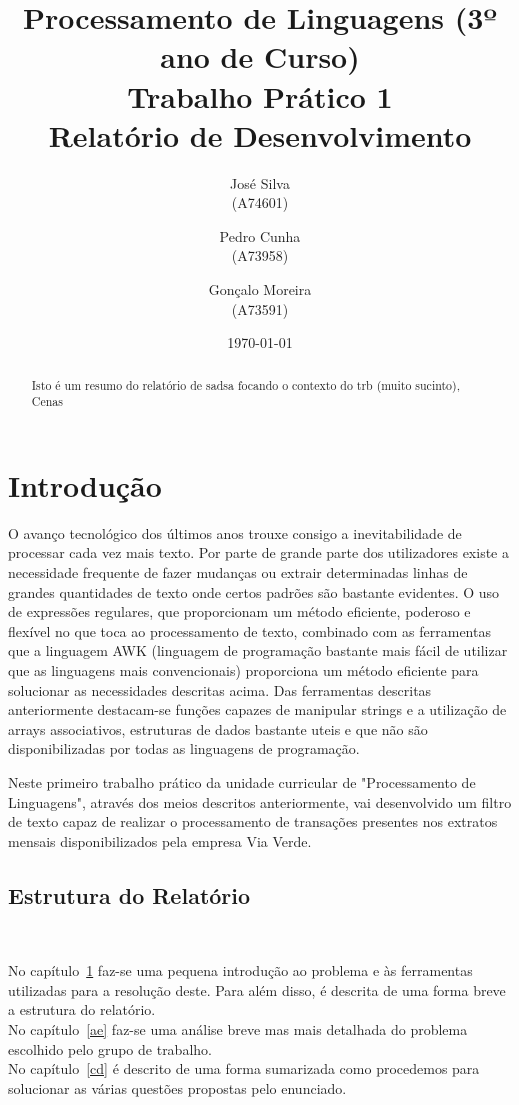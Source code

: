 \documentclass{report}
\title{Processamento de Linguagens (3º ano de Curso)\\ \textbf{Trabalho Prático 1}\\ Relatório de Desenvolvimento}
\author{José Silva\\ (A74601) \and Pedro Cunha\\ (A73958) \and Gonçalo Moreira\\ (A73591) }
\date{\today}
\begin{document}
\maketitle

\begin{abstract}
Isto é um resumo do relatório de sadsa focando o contexto do trb (muito sucinto),
Cenas
\end{abstract}

\tableofcontents


\chapter{Introdução} \label{intro}

O avanço tecnológico dos últimos anos trouxe consigo a inevitabilidade de processar cada vez mais texto.
Por parte de grande parte dos utilizadores existe a necessidade frequente de fazer mudanças ou extrair determinadas
linhas de grandes quantidades de texto onde certos padrões são bastante evidentes.
O uso de expressões regulares, que proporcionam um método eficiente, poderoso e flexível no que toca ao processamento de texto,
combinado com as ferramentas que a linguagem AWK (linguagem de programação bastante mais fácil de utilizar que as linguagens mais
convencionais) proporciona um método eficiente para solucionar as necessidades descritas acima. Das ferramentas descritas anteriormente
destacam-se funções capazes de manipular strings e a utilização de arrays associativos, estruturas de dados bastante uteis e que não são
disponibilizadas por todas as linguagens de programação.

Neste primeiro trabalho prático da unidade curricular de "Processamento de Linguagens", através dos meios descritos anteriormente,
vai desenvolvido um filtro de texto capaz de realizar o processamento de transações presentes nos extratos mensais disponibilizados
pela empresa Via Verde.


\section*{Estrutura do Relatório} \

No capítulo~\ref{intro} faz-se uma pequena introdução ao problema e às ferramentas utilizadas para a resolução deste.
Para além disso, é descrita de uma forma breve a estrutura do relatório.\\
No capítulo~\ref{ae} faz-se uma análise breve mas mais detalhada do problema escolhido pelo grupo de trabalho.\\
No capítulo~\ref{cd} é descrito de uma forma sumarizada como procedemos para solucionar as várias questões propostas pelo enunciado.
\end{document}
